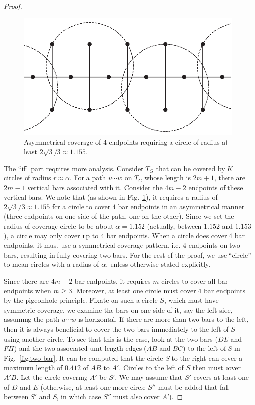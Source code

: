 \begin{proof}
  \begin{figure}[!ht]
    \centering
    \includegraphics[scale=0.33]{chapters/osg/figures/edgepath3-eps-converted-to.pdf}
  \vspace*{1mm}
    \caption{Asymmetrical coverage of $4$ endpoints requiring a circle of 
    radius at least $2\sqrt{3}/3\approx 1.155$.}
    \label{fig:pathcovert}
  \end{figure}

The ``if'' part requires more analysis. Consider $T_G$ that can be covered 
by $K$ circles of radius $r \approx \alpha$. For a path $u\cdots w$ on $T_G$ whose 
length is $2m+1$, there are $2m-1$ vertical bars associated with it. Consider 
the $4m-2$ endpoints of these vertical bars. We note that (as shown in 
Fig.~\ref{fig:pathcovert}), it requires a radius of $2\sqrt{3}/3\approx 1.155$ 
for a circle to cover $4$ bar endpoints in an asymmetrical manner (three endpoints
on one side of the path, one on the other). Since 
we set the radius of coverage circle to be about $\alpha = 1.152$ (actually, 
between $1.152$ and $1.153$),
a circle may only cover up to $4$ bar endpoints. When a circle does cover $4$ 
bar endpoints, it must use a symmetrical coverage pattern, i.e. $4$ endpoints
on two bars, resulting in fully covering two bars. For the 
rest of the proof, we use ``circle'' to mean circles with a radius of $\alpha$,
unless otherwise stated explicitly. 

Since there are $4m - 2$ bar endpoints, it requires $m$ circles to cover all 
bar endpoints when $m \ge 3$. Moreover, at least one circle must cover $4$ 
bar endpoints by the pigeonhole principle. Fixate on such a circle $S$, which 
must have symmetric coverage, we examine the bars on one side of it, say the 
left side, assuming the path $u\cdots w$ is horizontal. If there are more 
than two bars to the left, then it is always beneficial to cover the two bars 
immediately to the left of $S$ using another circle. To see that this is the 
case, look at the two bars ($DE$ and $FH$) and the two associated unit 
length edges ($AB$ and $BC$) to the left of $S$ in Fig.~\ref{fig:two-bar}.
It can be computed that the circle $S$ to the right can cover a maximum 
length of $0.412$ of $AB$ to $A'$. Circles to the left of $S$ then must cover 
$A'B$. Let the circle covering $A'$ be $S'$. We may assume that 
$S'$ covers at least one of $D$ and $E$ (otherwise, at least one more circle 
$S''$ must be added that fall between $S'$ and $S$, in which case $S''$ 
must also cover $A'$). 


\end{proof}
